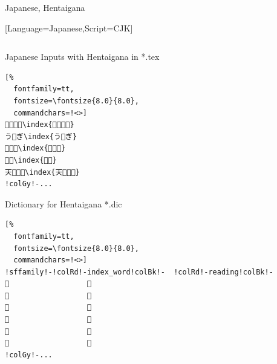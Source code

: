 \documentclass[aspectratio=169,10pt]{beamer}
\begin{document}
\begin{frame}[fragile]{Japanese, Hentaigana}

\setmonofont{ipamjm.ttf}[Language=Japanese,Script=CJK]
\begin{columns}
\begin{column}{70mm}
\begin{exampleblock}{Japanese Inputs with Hentaigana in *.tex}
\begin{Verbatim}[%
  fontfamily=tt,
  fontsize=\fontsize{8.0}{8.0},
  commandchars=!<>]
𛀥𛁛𛂦゙\index{𛀥𛁛𛂦゙}
う𛂁ぎ\index{う𛂁ぎ}
𛁈る𛀸\index{𛁈る𛀸}
𛁋𛁅\index{𛁋𛁅}
天𛂱゚𛃭\index{天𛂱゚𛃭}
!colGy!-...
\end{Verbatim}
\end{exampleblock}
\begin{exampleblock}{Dictionary for Hentaigana *.dic}
\setsansfont{Noto Sans}
\begin{Verbatim}[%
  fontfamily=tt,
  fontsize=\fontsize{8.0}{8.0},
  commandchars=!<>]
!sffamily!-!colRd!-index_word!colBk!-  !colRd!-reading!colBk!-
𛀥                  き
𛁛                  そ
𛂦                  は
𛂁                  な
𛁈                  し
𛀸                  こ
!colGy!-...
\end{Verbatim}
\end{exampleblock}
\end{column}

\begin{column}{60mm}
\begin{center}
%
\end{center}
\end{column}
\end{columns}

\end{frame}

\end{document}
